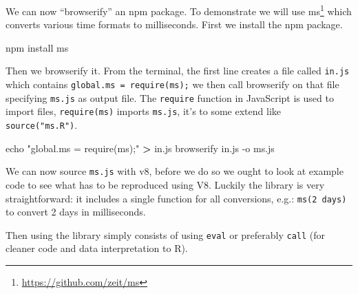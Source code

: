 \documentclass[
]{krantz}
\makeatletter
\newenvironment{Shaded}{\begin{snugshade}}{\end{snugshade}}
\newcommand{\BuiltInTok}[1]{#1}
\newcommand{\ExtensionTok}[1]{#1}
\newcommand{\KeywordTok}[1]{\textcolor[rgb]{0.27,0.27,0.27}{\textbf{#1}}}
\newcommand{\NormalTok}[1]{#1}
\newcommand{\OperatorTok}[1]{\textcolor[rgb]{0.43,0.43,0.43}{\textbf{#1}}}
\newcommand{\StringTok}[1]{\textcolor[rgb]{0.5,0.5,0.5}{#1}}
\renewcommand{\href}[2]{#2\footnote{\url{#1}}}
\newenvironment{kframe}{%
\medskip{}
\setlength{\fboxsep}{.8em}
 \def\at@end@of@kframe{}%
 \ifinner\ifhmode%
  \def\at@end@of@kframe{\end{minipage}}%
  \begin{minipage}{\columnwidth}%
 \fi\fi%
 \def\FrameCommand##1{\hskip\@totalleftmargin \hskip-\fboxsep
 \colorbox{shadecolor}{##1}\hskip-\fboxsep
     \hskip-\linewidth \hskip-\@totalleftmargin \hskip\columnwidth}%
 \MakeFramed {\advance\hsize-\width
   \@totalleftmargin\z@ \linewidth\hsize
   \@setminipage}}%
 {\par\unskip\endMakeFramed%
 \at@end@of@kframe}
\renewenvironment{Shaded}{\begin{kframe}}{\end{kframe}}
\makeatother
\begin{document}
We can now ``browserify'' an npm package. To demonstrate we will use \href{https://github.com/zeit/ms}{ms} which converts various time formats to milliseconds. First we install the npm package.

\begin{Shaded}
\begin{Highlighting}[]
\ExtensionTok{npm}\NormalTok{ install ms}
\end{Highlighting}
\end{Shaded}

Then we browserify it. From the terminal, the first line creates a file called \texttt{in.js} which contains \texttt{global.ms\ =\ require(\textquotesingle{}ms\textquotesingle{});} we then call browserify on that file specifying \texttt{ms.js} as output file. The \texttt{require} function in JavaScript is used to import files, \texttt{require(\textquotesingle{}ms\textquotesingle{})} imports \texttt{ms.js}, it's to some extend like \texttt{source("ms.R")}.

\begin{Shaded}
\begin{Highlighting}[]
\BuiltInTok{echo} \StringTok{"global.ms = require(\textquotesingle{}ms\textquotesingle{});"} \OperatorTok{>}\NormalTok{ in.js}
\ExtensionTok{browserify}\NormalTok{ in.js {-}o ms.js}
\end{Highlighting}
\end{Shaded}

We can now source \texttt{ms.js} with v8, before we do so we ought to look at example code to see what has to be reproduced using V8. Luckily the library is very straightforward: it includes a single function for all conversions, e.g.: \texttt{ms(\textquotesingle{}2\ days\textquotesingle{})} to convert 2 days in milliseconds.

\begin{Shaded}
\end{Shaded}

Then using the library simply consists of using \texttt{eval} or preferably \texttt{call} (for cleaner code and data interpretation to R).

\begin{Shaded}
\end{Shaded}
\end{document}
